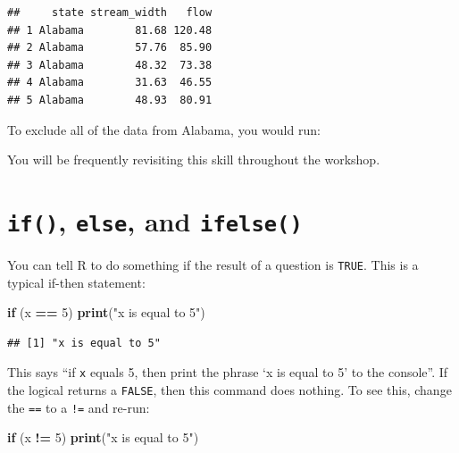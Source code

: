 \documentclass[]{book}
\newenvironment{Shaded}{\begin{snugshade}}{\end{snugshade}}
\newcommand{\KeywordTok}[1]{\textcolor[rgb]{0.13,0.29,0.53}{\textbf{#1}}}
\newcommand{\DecValTok}[1]{\textcolor[rgb]{0.00,0.00,0.81}{#1}}
\newcommand{\StringTok}[1]{\textcolor[rgb]{0.31,0.60,0.02}{#1}}
\newcommand{\ControlFlowTok}[1]{\textcolor[rgb]{0.13,0.29,0.53}{\textbf{#1}}}
\newcommand{\OperatorTok}[1]{\textcolor[rgb]{0.81,0.36,0.00}{\textbf{#1}}}
\newcommand{\NormalTok}[1]{#1}
\theoremstyle{definition}
\theoremstyle{definition}
\theoremstyle{definition}
\theoremstyle{remark}
\begin{document}
\begin{verbatim}
##     state stream_width   flow
## 1 Alabama        81.68 120.48
## 2 Alabama        57.76  85.90
## 3 Alabama        48.32  73.38
## 4 Alabama        31.63  46.55
## 5 Alabama        48.93  80.91
\end{verbatim}

To exclude all of the data from Alabama, you would run:

\begin{Shaded}
\end{Shaded}

You will be frequently revisiting this skill throughout the workshop.

\section{\texorpdfstring{\texttt{if()}, \texttt{else}, and
\texttt{ifelse()}}{if(), else, and ifelse()}}\label{if-else-and-ifelse}

You can tell R to do something if the result of a question is
\texttt{TRUE}. This is a typical if-then statement:

\begin{Shaded}
\begin{Highlighting}[]
\ControlFlowTok{if}\NormalTok{ (x }\OperatorTok{==}\StringTok{ }\DecValTok{5}\NormalTok{) }\KeywordTok{print}\NormalTok{(}\StringTok{"x is equal to 5"}\NormalTok{)}
\end{Highlighting}
\end{Shaded}

\begin{verbatim}
## [1] "x is equal to 5"
\end{verbatim}

This says ``if \texttt{x} equals 5, then print the phrase `x is equal to
5' to the console''. If the logical returns a \texttt{FALSE}, then this
command does nothing. To see this, change the \texttt{==} to a
\texttt{!=} and re-run:

\begin{Shaded}
\begin{Highlighting}[]
\ControlFlowTok{if}\NormalTok{ (x }\OperatorTok{!=}\StringTok{ }\DecValTok{5}\NormalTok{) }\KeywordTok{print}\NormalTok{(}\StringTok{"x is equal to 5"}\NormalTok{)}
\end{Highlighting}
\end{Shaded}
\end{document}
